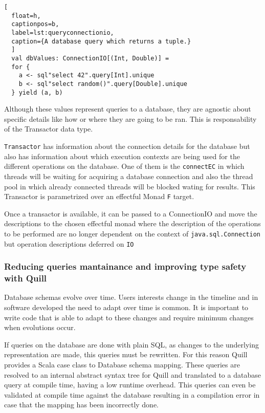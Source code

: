 \documentclass[../main.tex]{subfiles}
\begin{document}
\begin{lstlisting}[
  float=h,
  captionpos=b,
  label=lst:queryconnectionio,
  caption={A database query which returns a tuple.}
  ]
  val dbValues: ConnectionIO[(Int, Double)] =
  for {
    a <- sql"select 42".query[Int].unique
    b <- sql"select random()".query[Double].unique
  } yield (a, b)
\end{lstlisting}

Although these values represent queries to a database, they are agnostic about
specific details like how or where they are going to be ran. This is
responsability of the Transactor data type.

\texttt{Transactor} has information about the connection details for the
database but also has information about which execution contexts are being used
for the different operations on the database. One of them is the
\texttt{connectEC} in which threads will be waiting for acquiring a database
connection and also the thread pool in which already connected threads will be
blocked wating for results. This Transactor is parametrized over an effectful
Monad \texttt{F} target.

Once a transactor is available, it can be passed to a ConnectionIO and move the
descriptions to the chosen effectful monad where the description of the
operations to be performed are no longer dependent on the context of
\texttt{java.sql.Connection} but operation descriptions deferred on \texttt{IO}

\subsubsection{Reducing queries mantainance and improving type safety with Quill}
Database schemas evolve over time. Users interests change in the timeline and in
software developed the need to adapt over time is common. It is important to
write code that is able to adapt to these changes and require minimum changes
when evolutions occur.

If queries on the database are done with plain SQL, as changes to the underlying
representation are made, this queries must be rewritten. For this reason Quill
provides a Scala case class to Database schema mapping. These queries are
resolved to an internal abstract syntax tree for Quill and translated to a
database query at compile time, having a low runtime overhead. This queries can
even be validated at compile time against the database resulting in a
compilation error in case that the mapping has been incorrectly done.
\end{document}
